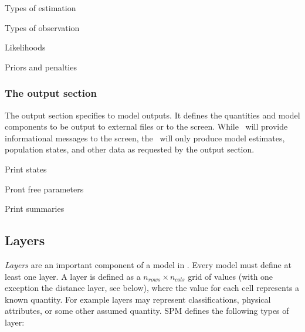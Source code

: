 Types of estimation

Types of observation

Likelihoods

Priors and penalties


\subsubsection{The output section}

The output section specifies to model outputs. It defines the quantities and model components to be output to external files or to the screen. While \SPM\ will provide informational messages to the screen, the \SPM\ will only produce model estimates, population states, and other data as requested by the output section. 

Print states

Pront free parameters

Print summaries


\subsection{Layers\label{sec:layers}}

\emph{Layers} are an important component of a model in \SPM. Every model must define at least one layer. A layer is defined as a $n_{rows} \times n_{cols}$ grid of values (with one exception \textemdash the distance layer, see below), where the value for each cell represents a known quantity. For example layers may represent classifications, physical attributes, or some other assumed quantity. SPM defines the following types of layer:

